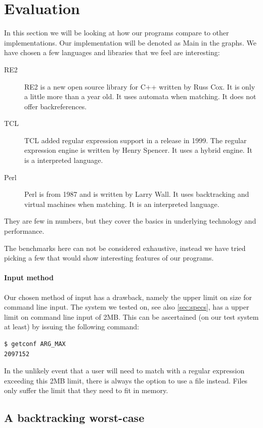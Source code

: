 \section{Evaluation}
\label{sec:evaluation}
In this section we will be looking at how our programs compare to
other implementations. Our implementation will be denoted as Main in
the graphs. We have chosen a few languages and libraries that we feel
are interesting:
\begin{description}
  \item[RE2] RE2 is a new open source library for C++ written by Russ
    Cox. It is only a little more than a year old. It uses automata
    when matching. It does not offer backreferences.
  \item[TCL]
    TCL added regular expression support in a release in 1999. The
    regular expression engine is written by Henry Spencer. It uses a
    hybrid engine. It is a interpreted language.
  \item[Perl] Perl is from 1987 and is written by Larry Wall. It uses
    backtracking and virtual machines when matching. It is an
    interpreted language. 
\end{description}
They are few in numbers, but they cover the basics in underlying
technology and performance. 

The benchmarks here can not be considered exhaustive, instead we have
tried picking a few that would show interesting features of our
programs.

\paragraph{Input method}
Our chosen method of input has a drawback, namely the upper limit on
size for command line input. The system we tested on, see also
\vref{sec:specs}, has a upper limit on command line input of 2MB. This
can be ascertained (on our test system at least) by issuing the
following command:
\begin{verbatim}
$ getconf ARG_MAX
2097152
\end{verbatim}
In the unlikely event that a user will need to match with a regular
expression exceeding this 2MB limit, there is always the option to use
a file instead. Files only suffer the limit that they need to fit in
memory.

\subsection{A backtracking worst-case}


